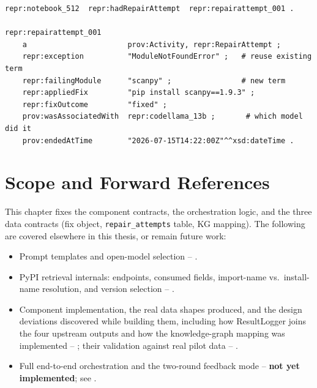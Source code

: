 \begin{verbatim}
repr:notebook_512  repr:hadRepairAttempt  repr:repairattempt_001 .

repr:repairattempt_001
    a                       prov:Activity, repr:RepairAttempt ;
    repr:exception          "ModuleNotFoundError" ;   # reuse existing term
    repr:failingModule      "scanpy" ;                # new term
    repr:appliedFix         "pip install scanpy==1.9.3" ;
    repr:fixOutcome         "fixed" ;
    prov:wasAssociatedWith  repr:codellama_13b ;       # which model did it
    prov:endedAtTime        "2026-07-15T14:22:00Z"^^xsd:dateTime .
\end{verbatim}

\section{Scope and Forward References}
\label{sec:arch-scope}

This chapter fixes the component contracts, the orchestration logic, and
the three data contracts (fix object, \texttt{repair\_attempts} table, KG
mapping). The following are covered elsewhere in this thesis, or remain
future work:

\begin{itemize}
  \item Prompt templates and open-model selection -- .
  \item PyPI retrieval internals: endpoints, consumed fields, import-name
        vs.\ install-name resolution, and version selection --
        .
  \item Component implementation, the real data shapes produced, and the
        design deviations discovered while building them, including how
        ResultLogger joins the four upstream outputs and how the
        knowledge-graph mapping was implemented -- ;
        their validation against real pilot data -- .
  \item Full end-to-end orchestration and the two-round feedback mode --
        \textbf{not yet implemented}; see .
\end{itemize}
